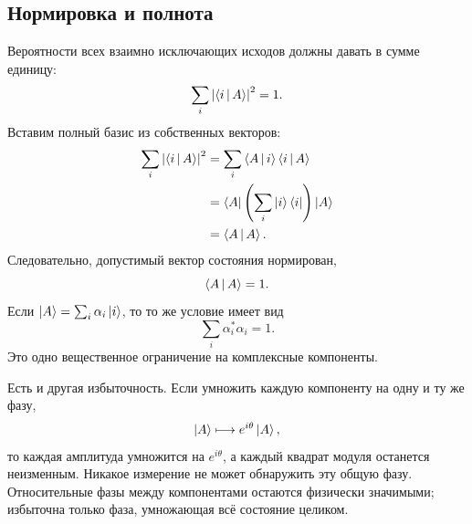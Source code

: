 \begin{classroomqa}
\end{classroomqa}

\subsection{Нормировка и полнота}

Вероятности всех взаимно исключающих исходов должны давать в сумме единицу:
\begin{equation}
\sum_i\left|\left\langle i\,\middle|\,A\right\rangle\right|^2=1.
\label{eq:probability-normalization}
\end{equation}
Вставим полный базис из собственных векторов:
\begin{align}
\sum_i\left|\left\langle i\,\middle|\,A\right\rangle\right|^2
 &=\sum_i\left\langle A\,\middle|\,i\right\rangle\left\langle i\,\middle|\,A\right\rangle\\
 &=\left\langle A\right\rvert\left(\sum_i\left\lvert i\right\rangle\left\langle i\right\rvert\right)\left\lvert A\right\rangle\\
 &=\left\langle A\,\middle|\,A\right\rangle.
\end{align}
Следовательно, допустимый вектор состояния нормирован,
\begin{equation}
\left\langle A\,\middle|\,A\right\rangle=1.
\label{eq:state-normalization}
\end{equation}
Если \(\left\lvert A\right\rangle=\sum_i\alpha_i\left\lvert i\right\rangle\), то то же условие имеет вид
\begin{equation}
\sum_i\alpha_i^*\alpha_i=1.
\label{eq:component-normalization}
\end{equation}
Это одно вещественное ограничение на комплексные компоненты.

\begin{classroomqa}
\end{classroomqa}

Есть и другая избыточность. Если умножить каждую компоненту на одну и ту же фазу,
\begin{equation}
\left\lvert A\right\rangle\longmapsto e^{i\theta}\left\lvert A\right\rangle,
\label{eq:l3-global-phase}
\end{equation}
то каждая амплитуда умножится на \(e^{i\theta}\), а каждый квадрат модуля останется неизменным. Никакое измерение не может обнаружить эту общую фазу. Относительные фазы между компонентами остаются физически значимыми; избыточна только фаза, умножающая всё состояние целиком.

